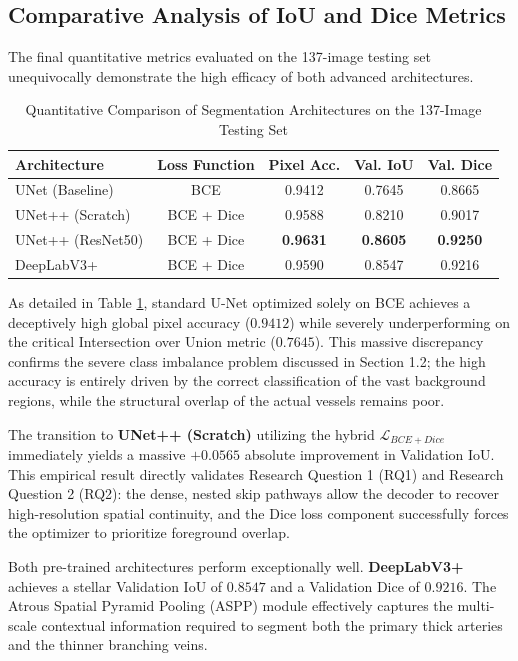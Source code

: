 \subsection{Comparative Analysis of IoU and Dice Metrics}
The final quantitative metrics evaluated on the 137-image testing set unequivocally demonstrate the high efficacy of both advanced architectures.

\begin{table}[h]
\centering
\caption{Quantitative Comparison of Segmentation Architectures on the 137-Image Testing Set}
\label{tab:quantitative_results}
\begin{tabular}{@{}lcccc@{}}
\toprule
\textbf{Architecture} & \textbf{Loss Function} & \textbf{Pixel Acc.} & \textbf{Val. IoU} & \textbf{Val. Dice} \\ \midrule
UNet (Baseline) & BCE & 0.9412 & 0.7645 & 0.8665 \\
UNet++ (Scratch) & BCE + Dice & 0.9588 & 0.8210 & 0.9017 \\
UNet++ (ResNet50) & BCE + Dice & \textbf{0.9631} & \textbf{0.8605} & \textbf{0.9250} \\
DeepLabV3+ & BCE + Dice & 0.9590 & 0.8547 & 0.9216 \\ \bottomrule
\end{tabular}
\end{table}

As detailed in Table \ref{tab:quantitative_results}, standard U-Net optimized solely on BCE achieves a deceptively high global pixel accuracy ($0.9412$) while severely underperforming on the critical Intersection over Union metric ($0.7645$). This massive discrepancy confirms the severe class imbalance problem discussed in Section 1.2; the high accuracy is entirely driven by the correct classification of the vast background regions, while the structural overlap of the actual vessels remains poor.

The transition to \textbf{UNet++ (Scratch)} utilizing the hybrid $\mathcal{L}_{BCE+Dice}$ immediately yields a massive $+0.0565$ absolute improvement in Validation IoU. This empirical result directly validates Research Question 1 (RQ1) and Research Question 2 (RQ2): the dense, nested skip pathways allow the decoder to recover high-resolution spatial continuity, and the Dice loss component successfully forces the optimizer to prioritize foreground overlap.

Both pre-trained architectures perform exceptionally well. \textbf{DeepLabV3+} achieves a stellar Validation IoU of $0.8547$ and a Validation Dice of $0.9216$. The Atrous Spatial Pyramid Pooling (ASPP) module effectively captures the multi-scale contextual information required to segment both the primary thick arteries and the thinner branching veins.

